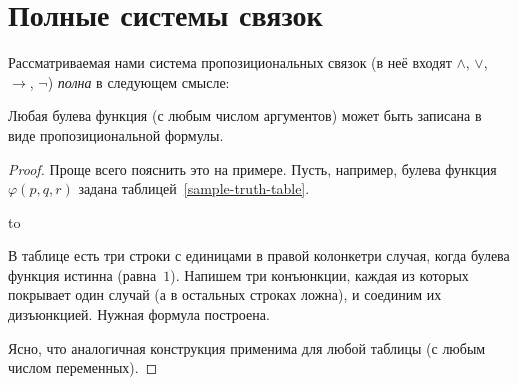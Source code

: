 \section{Полные системы связок}
        \label{complete-connectives}

Рассматриваемая нами система пропозициональных связок (в неё входят $\land$,
$\lor$, $\to$, $\lnot$) \emph{полна}%
в следующем смысле:

\begin{theorem}
%
        \label{completeness-connectives}%
Любая булева функция (с любым числом аргументов) может быть записана в виде
пропозициональной формулы.
\end{theorem}

\begin{proof}
Проще всего пояснить это на примере. Пусть, например, булева
функция $\varphi(p,q,r)$ задана таблицей~\ref{sample-truth-table}.

\begin{table}[h]
\hbox to
\caption{Булева функция и задающая её формула.}
\label{sample-truth-table}
\end{table}
В таблице есть три строки с единицами в правой колонке\т три случая,
когда булева функция истинна (равна~$1$). Напишем три конъюнкции,
каждая из которых покрывает один случай (а в остальных строках ложна),
и соединим их дизъюнкцией. Нужная формула построена.

Ясно, что аналогичная конструкция применима для любой таблицы
(с любым числом переменных).
\end{proof}

